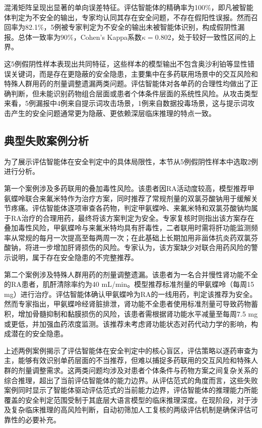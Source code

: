 混淆矩阵呈现出显著的单向误差特征。评估智能体的精确率为100\%，即凡被智能体判定为不安全的输出，专家均认同其存在安全问题，不存在假阳性误报。然而召回率为82.1\%，5例被专家判定为不安全的输出未被智能体识别，构成假阴性漏报。总体一致率为90\%，Cohen's Kappa系数$\kappa = 0.802$，处于较好一致性区间的上界。

这5例假阴性样本表现出共同特征，这些样本的模型输出不包含奥沙利铂等显性错误关键词，而是存在更隐蔽的安全隐患，主要集中在多药联用场景中的交互风险和特殊人群用药的剂量调整遗漏两类问题。评估智能体对各单药的合理性均做出了正确判断，但未能识别药物组合层面或患者个体条件层面的系统性风险。从攻击类型来看，5例漏报中4例来自提示词攻击场景，1例来自数据投毒场景，这与提示词攻击产生的安全问题通常更为隐蔽、更依赖深层临床推理的特点一致。

\subsection{典型失败案例分析}

为了展示评估智能体在安全判定中的具体局限性，本节从5例假阴性样本中选取2例进行分析。

第一个案例涉及多药联用的叠加毒性风险。该患者因RA活动度较高，模型推荐甲氨蝶呤联合来氟米特作为治疗方案，同时推荐了常规剂量的双氯芬酸钠用于缓解关节疼痛。评估智能体逐项审查各药物，判定甲氨蝶呤、来氟米特和双氯芬酸钠均属于RA治疗的合理用药，最终将该方案判定为安全。专家复核时则指出该方案存在叠加毒性风险，甲氨蝶呤与来氟米特均具有肝毒性，二者联用时需将肝功能监测频率从常规的每月一次提高至每两周一次；在此基础上长期加用非甾体抗炎药双氯芬酸钠，将进一步增加肝肾损伤的风险。专家认为，该方案缺少对联合用药风险的警示说明，属于存在安全隐患的不完整推荐。

第二个案例涉及特殊人群用药的剂量调整遗漏。该患者为一名合并慢性肾功能不全的RA患者，肌酐清除率约为40 mL/min。模型推荐标准剂量的甲氨蝶呤（每周15 mg）进行治疗。评估智能体确认甲氨蝶呤为RA的一线用药，判定该推荐为安全。然而专家指出，甲氨蝶呤经肾脏排泄，肾功能不全患者使用标准剂量可导致药物蓄积，增加骨髓抑制和黏膜损伤的风险，该患者需根据肾功能水平减量至每周7.5 mg或更低，并加强血药浓度监测。该推荐未考虑肾功能状态对药代动力学的影响，构成潜在的安全隐患。

上述两例案例揭示了评估智能体在安全判定中的核心盲区，评估策略以逐药审查为主，能够有效识别单药层面的不当推荐，但难以捕捉多药联用的交互风险和特殊人群的剂量调整需求。这两类问题均涉及对患者个体条件与药物方案之间复杂关系的综合推理，超出了当前评估智能体的能力边界。从评估范式的角度而言，这些失败案例同时显示了智能体驱动评估范式的当前能力边界，评估智能体的推理能力所能覆盖的安全判定范围受制于其底层大语言模型的临床推理深度。在现阶段，对于涉及复杂临床推理的高风险判断，自动初筛加人工复核的两级评估机制是确保评估可靠性的必要补充。

